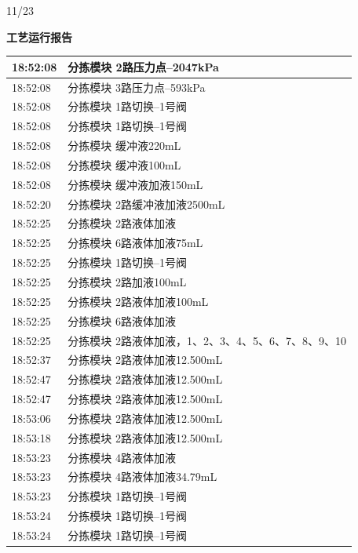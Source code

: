 \documentclass[UTF8,10pt,a4paper,fontset=fandol]{ctexart}
\newcommand{\handwritten}[1]{#1}
\begin{document}
\hfill\handwritten{11/23}

\newpage

\begin{center}
\begin{minipage}[t]{0.47\linewidth}
\centering
\textbf{工艺运行报告}

\smallskip
\scriptsize
\begin{tabular}{|p{1.25cm}|p{5.35cm}|}
\hline
18:52:08 & 分拣模块 2路压力点--2047kPa \\
\hline
18:52:08 & 分拣模块 3路压力点--593kPa \\
\hline
18:52:08 & 分拣模块 1路切换--1号阀 \\
\hline
18:52:08 & 分拣模块 1路切换--1号阀 \\
\hline
18:52:08 & 分拣模块 缓冲液220mL \\
\hline
18:52:08 & 分拣模块 缓冲液100mL \\
\hline
18:52:08 & 分拣模块 缓冲液加液150mL \\
\hline
18:52:20 & 分拣模块 2路缓冲液加液2500mL \\
\hline
18:52:25 & 分拣模块 2路液体加液 \\
\hline
18:52:25 & 分拣模块 6路液体加液75mL \\
\hline
18:52:25 & 分拣模块 1路切换--1号阀 \\
\hline
18:52:25 & 分拣模块 2路加液100mL \\
\hline
18:52:25 & 分拣模块 2路液体加液100mL \\
\hline
18:52:25 & 分拣模块 6路液体加液 \\
\hline
18:52:25 & 分拣模块 2路液体加液，1、2、3、4、5、6、7、8、9、10 \\
\hline
18:52:37 & 分拣模块 2路液体加液12.500mL \\
\hline
18:52:47 & 分拣模块 2路液体加液12.500mL \\
\hline
18:52:47 & 分拣模块 2路液体加液12.500mL \\
\hline
18:53:06 & 分拣模块 2路液体加液12.500mL \\
\hline
18:53:18 & 分拣模块 2路液体加液12.500mL \\
\hline
18:53:23 & 分拣模块 4路液体加液 \\
\hline
18:53:23 & 分拣模块 4路液体加液34.79mL \\
\hline
18:53:23 & 分拣模块 1路切换--1号阀 \\
\hline
18:53:24 & 分拣模块 1路切换--1号阀 \\
\hline
18:53:24 & 分拣模块 1路切换--1号阀 \\
\hline
\end{tabular}


\end{minipage}
\end{center}
\end{document}
